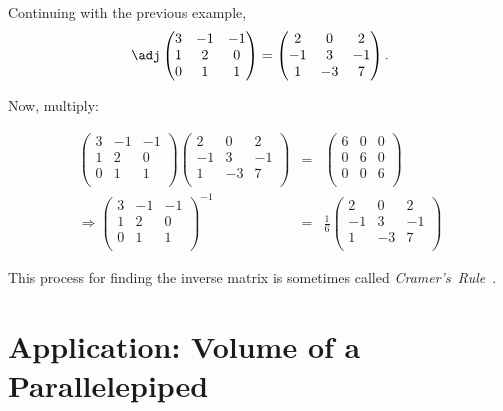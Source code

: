 \begin{example}
Continuing with the previous example,
\[
\adj \begin{pmatrix}
3 & -1 & -1 \\
1 & 2 & 0 \\
0 & 1 & 1 \\
\end{pmatrix} = \begin{pmatrix}
2 & 0 & 2 \\
-1 & 3 & -1 \\
1 & -3 & 7 \\
\end{pmatrix}.
\]

Now, multiply:

\begin{eqnarray*}
\begin{pmatrix}
3 & -1 & -1 \\
1 & 2 & 0 \\
0 & 1 & 1 \\
\end{pmatrix}
\begin{pmatrix}
2 & 0 & 2 \\
-1 & 3 & -1 \\
1 & -3 & 7 \\
\end{pmatrix}
&=&
\begin{pmatrix}
6 & 0 & 0 \\
0 & 6 & 0 \\
0 & 0 & 6 \\
\end{pmatrix} \\[1mm]
\Rightarrow \begin{pmatrix}
3 & -1 & -1 \\
1 & 2 & 0 \\
0 & 1 & 1 \\
\end{pmatrix}^{-1} & = & \frac{1}{6}\begin{pmatrix}
2 & 0 & 2 \\
-1 & 3 & -1 \\
1 & -3 & 7 \\
\end{pmatrix}
\end{eqnarray*}

This process for finding the inverse matrix is sometimes called \emph{Cramer's~Rule}~.
\end{example}

\section{Application: Volume of a Parallelepiped}


